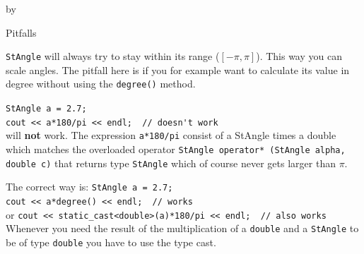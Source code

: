 \documentclass[twoside]{article}
\newcommand{\entrylabel}[1]{\mbox{\textbf{{#1}}}\hfil}%
\newenvironment{entry}
{\begin{list}{}%
    {\renewcommand{\makelabel}{\entrylabel}%
     \setlength{\labelwidth}{90pt}%
     \setlength{\leftmargin}{\labelwidth}
     \advance\leftmargin by \labelsep%
      }%
    }%
  {\end{list}}
\newcommand{\Entrylabel}[1]%
{\raisebox{0pt}[1ex][0pt]{\makebox[\labelwidth][l]%
    {\parbox[t]{\labelwidth}{\hspace{0pt}\textbf{{#1}}}}}}
\newenvironment{Entry}%
{\renewcommand{\entrylabel}{\Entrylabel}\begin{entry}}%
  {\end{entry}}
\begin{document}
\begin{Entry}
\item[Pitfalls]

    \texttt{StAngle} will always try to stay within its
    range ($[-\pi, \pi]$).  This way you can scale angles. The pitfall
    here is if you for example want to calculate its value in degree
    without using the \texttt{degree()} method.
    
    \verb+StAngle a = 2.7;+\\
    \verb+cout << a*180/pi << endl;  // doesn't work+\\
    
    will \textbf{not} work. The expression \texttt{a*180/pi} consist
    of a StAngle times a double which matches the overloaded operator
    \texttt{StAngle operator* (StAngle alpha, double c)} that returns
    type \texttt{StAngle} which of course never gets larger than
    $\pi$.
    
    The correct way is:
    \verb+StAngle a = 2.7;+\\
    \verb+cout << a*degree() << endl;  // works +\\
    or
    \verb+cout << static_cast<double>(a)*180/pi << endl;  // also works +\\
    
    Whenever you need the result of the multiplication of a
    \texttt{double} and a \texttt{StAngle} to be of type
    \texttt{double} you have to use the type cast.
    

\end{Entry}

\clearpage


%
%
\end{document}
